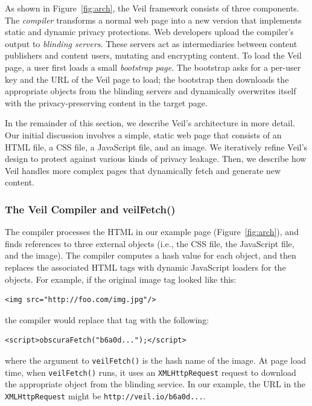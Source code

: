 As shown in Figure~\ref{fig:arch}, the Veil framework  %
consists of three components. The \emph{compiler}
transforms a normal web page into a new version
that implements static and dynamic privacy protections.
Web developers upload the compiler's output to
\emph{blinding servers}. These servers act as
intermediaries between content publishers and
content users, mutating and encrypting content. To load the Veil
page, a user first loads a small \emph{bootstrap page}.
The bootstrap asks for a per-user key and the
URL of the Veil page to load; the bootstrap then
downloads the appropriate objects from the blinding
servers and dynamically overwrites itself with
the privacy-preserving content in the target page.

In the remainder of this section, we describe Veil's
architecture in more detail. Our initial discussion
involves a simple, static web page that consists of
an HTML file, a CSS file, a JavaScript file, and an
image. We iteratively refine Veil's design to protect
against various kinds of privacy leakage. Then, we
describe how Veil handles more complex pages that
dynamically fetch and generate new content.


\subsubsection{The Veil Compiler and veilFetch()}
\label{sec:compiler}

The compiler processes the HTML in our example page (Figure~\ref{fig:arch}),
and finds references to three external objects (i.e.,
the CSS file, the JavaScript file, and the image).
The compiler computes a hash value for each object,
and then replaces the associated HTML tags with
dynamic JavaScript loaders for the objects. For
example, if the original image tag looked like this:
\begin{verbatim}
<img src="http://foo.com/img.jpg"/>
\end{verbatim}
\noindent
the compiler would replace that tag with the following:
\noindent
\begin{verbatim}
<script>obscuraFetch("b6a0d...");</script>
\end{verbatim}
where the argument to \texttt{veilFetch()} is the hash
name of the image. At page load time, when
\texttt{veilFetch()} runs, it uses an \texttt{XMLHttpRequest}
request to download the appropriate object from the
blinding service. In our example, the URL in the
\texttt{XMLHttpRequest} might be \texttt{http://veil.io/b6a0d...}.

